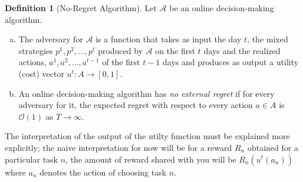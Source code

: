 \documentclass[a4paper,10pt]{article}
\theoremstyle{definition}
\newtheorem{defn}[thm]{Definition}
\begin{document}
\begin{defn}[No-Regret Algorithm]
Let $\mathcal{A}$ be an online decision-making algorithm.
\begin{enumerate}[(a)]
\item The adversary for $\mathcal{A}$ is a function that takes as input the day $t$, the mixed strategies $p^1,p^2,\ldots,p^t$ produced by $\mathcal{A}$ on the first $t$ days and the realized actions, $a^1,a^2,\ldots, a^{t-1}$ of the first $t-1$ days and produces as output a utility (cost) vector $u^t:A\to [0,1]$.
\item An online decision-making algorithm has \emph{no external regret} if for every adversary for it, the expected regret with respect to every action $a\in A$ is $\mathcal{O}(1)$ as $T \to \infty$.
\end{enumerate}
\end{defn}
The interpretation of the output of the utilty function must be explained more explicitly; the naive interpretation for now will be for a reward $R_n$ obtained for a particular task $n$, the amount of reward shared with you will be $R_n(u^t(a_n))$ where $a_n$ denotes the action of choosing task $n$.
\end{document}
